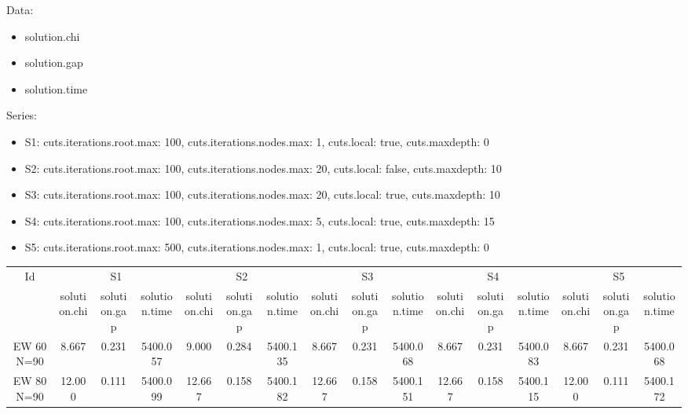 \documentclass[landscape, 12pt]{report}
\begin{document}
Data:
\begin{itemize}
\item solution.chi
\item solution.gap
\item solution.time
\end{itemize}
Series:
\begin{itemize}
\item S1: cuts.iterations.root.max: 100, cuts.iterations.nodes.max: 1, cuts.local: true, cuts.maxdepth: 0
\item S2: cuts.iterations.root.max: 100, cuts.iterations.nodes.max: 20, cuts.local: false, cuts.maxdepth: 10
\item S3: cuts.iterations.root.max: 100, cuts.iterations.nodes.max: 20, cuts.local: true, cuts.maxdepth: 10
\item S4: cuts.iterations.root.max: 100, cuts.iterations.nodes.max: 5, cuts.local: true, cuts.maxdepth: 15
\item S5: cuts.iterations.root.max: 500, cuts.iterations.nodes.max: 1, cuts.local: true, cuts.maxdepth: 0
\end{itemize}
\begin{tabular}{|c|ccc|ccc|ccc|ccc|ccc|}
\hline
\multicolumn{1}{|c|}{Id} & \multicolumn{3}{|c|}{S1} & \multicolumn{3}{|c|}{S2} & \multicolumn{3}{|c|}{S3} & \multicolumn{3}{|c|}{S4} & \multicolumn{3}{|c|}{S5}
\\
 & solution.chi & solution.gap & solution.time & solution.chi & solution.gap & solution.time & solution.chi & solution.gap & solution.time & solution.chi & solution.gap & solution.time & solution.chi & solution.gap & solution.time
\\
\hline
EW 60 N=90 & 8.667 & 0.231 & 5400.057 & 9.000 & 0.284 & 5400.135 & 8.667 & 0.231 & 5400.068 & 8.667 & 0.231 & 5400.083 & 8.667 & 0.231 & 5400.068
\\
EW 80 N=90 & 12.000 & 0.111 & 5400.099 & 12.667 & 0.158 & 5400.182 & 12.667 & 0.158 & 5400.151 & 12.667 & 0.158 & 5400.115 & 12.000 & 0.111 & 5400.172
\\
\hline 
 \end{tabular}
\end{document}
